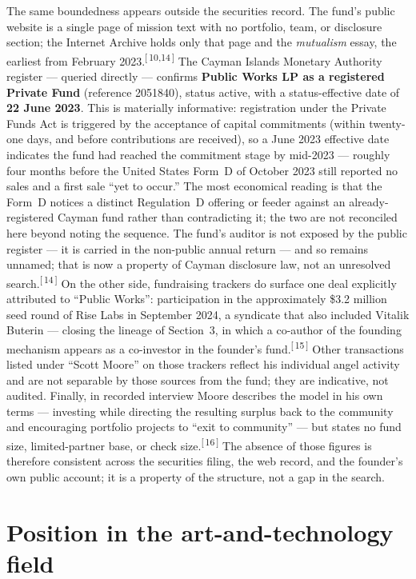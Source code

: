 \documentclass[11pt,letterpaper]{article}
\newcommand{\refn}[1]{\textsuperscript{[\,#1\,]}}
\begin{document}
The same boundedness appears outside the securities record. The fund's public
website is a single page of mission text with no portfolio, team, or
disclosure section; the Internet Archive holds only that page and the
\textit{mutualism} essay, the earliest from February 2023.\refn{10,14} The
Cayman Islands Monetary Authority register --- queried directly --- confirms
\textbf{Public Works LP as a registered Private Fund} (reference 2051840),
status active, with a status-effective date of \textbf{22 June 2023}. This is
materially informative: registration under the Private Funds Act is triggered
by the acceptance of capital commitments (within twenty-one days, and before
contributions are received), so a June 2023 effective date indicates the fund
had reached the commitment stage by mid-2023 --- roughly four months before
the United States Form~D of October 2023 still reported no sales and a first
sale ``yet to occur.'' The most economical reading is that the Form~D notices
a distinct Regulation~D offering or feeder against an already-registered
Cayman fund rather than contradicting it; the two are not reconciled here
beyond noting the sequence. The fund's auditor is not exposed by the public
register --- it is carried in the non-public annual return --- and so remains
unnamed; that is now a property of Cayman disclosure law, not an unresolved
search.\refn{14} On the other side, fundraising trackers do surface one
deal explicitly attributed to ``Public Works'': participation in the
approximately \$3.2 million seed round of Rise Labs in September 2024, a
syndicate that also included Vitalik Buterin --- closing the lineage of
Section~3, in which a co-author of the founding mechanism appears as a
co-investor in the founder's fund.\refn{15} Other transactions listed under
``Scott Moore'' on those trackers reflect his individual angel activity and
are not separable by those sources from the fund; they are indicative, not
audited. Finally, in recorded interview Moore describes the model in his own
terms --- investing while directing the resulting surplus back to the
community and encouraging portfolio projects to ``exit to community'' --- but
states no fund size, limited-partner base, or check size.\refn{16} The
absence of those figures is therefore consistent across the securities
filing, the web record, and the founder's own public account; it is a
property of the structure, not a gap in the search.

\section{Position in the art-and-technology field}
\end{document}
